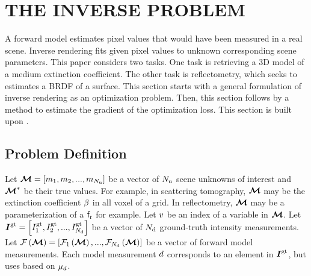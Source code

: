 \documentclass{article}
\begin{document}
\section{THE INVERSE PROBLEM}
\label{sec:inverse}
A forward model estimates pixel values that would have been measured in a real scene. Inverse rendering fits given pixel values to unknown corresponding scene parameters. This paper considers two tasks. One task is retrieving a 3D model of a medium extinction coefficient. The other task is reflectometry, which seeks to estimates a \ac{BRDF} of a surface. This section starts with a general formulation of inverse rendering as an optimization problem. Then, this section follows by a method to estimate the gradient of the optimization loss. This section is built upon \citep{loeub2020monotonicity}.
\subsection{Problem Definition}
\label{sec:inverse_problem_definition}
Let $\boldsymbol{\mathcal{M}} = \left[{m_1, m_2,...,m_{N_{\text{u}}}}\right]$ be a vector of $N_{\text{u}}$ scene unknowns of interest and $\boldsymbol{\mathcal{M}}^{*}$ be their true values. For example, in scattering tomography, $\boldsymbol{\mathcal{M}}$ may be the extinction coefficient $\beta$ in all voxel of a grid. In reflectometry, $\boldsymbol{\mathcal{M}}$ may be a parameterization of a $\mathsf{f}_{\text{r}}$ for example. Let $v$ be an index of a variable in $\boldsymbol{\mathcal{M}}$. Let $\boldsymbol{I}^{\text{gt}}=\left[{I^{\text{gt}}_1,I^{\text{gt}}_2, ..., I^{\text{gt}}_{N_{\text{d}}}}\right]$ be a vector of $N_{\text{d}}$ ground-truth intensity measurements. Let $\mathcal{F}\left({\boldsymbol{\mathcal{M}}}\right)=\left[{\mathcal{F}_1\left({\boldsymbol{\mathcal{M}}}\right),...,\mathcal{F}_{N_{\text{d}}}\left({\boldsymbol{\mathcal{M}}}\right)}\right]$ be a vector of forward model measurements. Each model measurement $d$ corresponds to an element in $\boldsymbol{I}^{\text{gt}}$, but uses  \eq{\ref{eq:path_integral_formulation}} based on $\mu_{d}$. 
\end{document}
